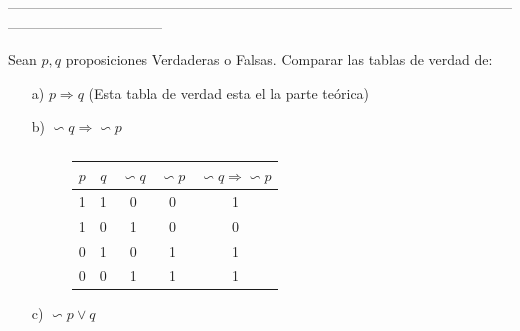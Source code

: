 \documentclass[10pt]{article}
\begin{document}
---------------------------------------------------------------------------------------------------------------------------------------------
\begin{ej}
	Sean $p,q$ proposiciones Verdaderas o Falsas. Comparar las tablas de verdad de:
	\begin{itemize}
		\item [a)]  $p \Rightarrow q$ (Esta tabla de verdad esta el la parte teórica) 
		\item [b)]  $\backsim q \Rightarrow \backsim p$
		\begin{figure}[H]
	  		\begin{minipage}[b]{0.6\linewidth}
				\begin{table}[H]
					\begin{center}
						\begin{tabular}{|c|c|c|c|c|}
					\hline
					$p$ & $q$ & $\backsim q$ & $\backsim p$ & $\backsim q \Rightarrow \backsim p$\\ \hline 
					  1   &   1    &       0                 &             0            &                           1 \\ \hline
					 1   &   0    &       1                 &             0            &                           0 \\ \hline
					  0   &   1    &       0                 &             1            &                           1 \\ \hline
					   0   &   0    &       1                 &             1            &                           1 \\ \hline
							\end{tabular}
						\caption{ }
					\end{center}
				\end{table}				
			\end{minipage}	 	
			\begin{minipage}[b]{0.4\linewidth}	
			\end{minipage}
		\end{figure}				
		
		\item [c)]  $\backsim p \lor q$
			\begin{figure}[H]
	  		\begin{minipage}[b]{0.4\linewidth}
				

\end{minipage}
\end{figure}
\end{itemize}
\end{ej}
\end{document}
